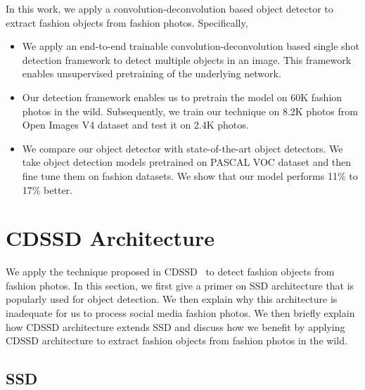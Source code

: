 \documentclass[sigconf]{acmart}
\begin{document}
In this work, we apply a convolution-deconvolution based
object detector to extract fashion objects from fashion photos.
Specifically,
\begin{itemize}
\item We apply an end-to-end trainable convolution-deconvolution based
single shot detection framework to detect multiple objects in an image.
This framework enables unsupervised pretraining of the underlying network.
\item Our detection framework enables us to pretrain the model on 60K fashion
photos in the wild. Subsequently, 
we train our technique on 8.2K photos from Open Images V4 dataset
and test it on 2.4K photos.
\item We compare our object detector with state-of-the-art
object detectors. We take object detection models pretrained
on PASCAL VOC dataset and then fine tune them on fashion datasets.
We show that our model performs 11\% to 17\% better. 
\end{itemize}


\section{CDSSD Architecture}

We apply the technique proposed in CDSSD~\cite{CDSSD18}
to detect fashion objects from fashion photos.
In this section, 
we first give a primer on SSD architecture
that is popularly used for object detection.
We then explain why this architecture is
inadequate for us to process social media fashion photos.
We then briefly explain how CDSSD architecture extends SSD
and discuss how we benefit by applying CDSSD architecture
to extract fashion objects from fashion photos
in the wild.

\subsection{SSD}
\end{document}
